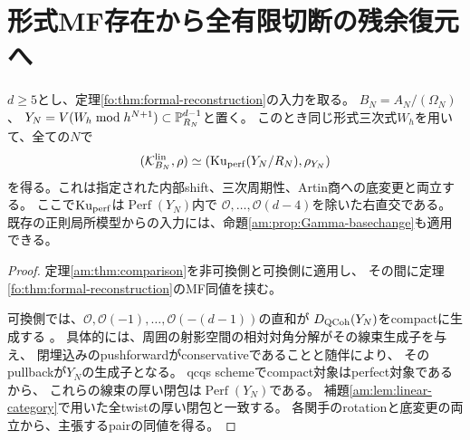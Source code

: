 \section{形式MF存在から全有限切断の残余復元へ}
\begin{corollary}[全有限Artin切断における可換残余復元]
\label{am:cor:formal-residual}
$d\ge5$とし、定理\ref{fo:thm:formal-reconstruction}の入力を取る。
$B_N=A_N/(\Omega_N)$、
$Y_N=V(W_h\bmod h^{N+1})\subset\mathbb P^{d-1}_{R_N}$と置く。
このとき同じ形式三次式$W_h$を用いて、全ての$N$で
\[
 (\mathcal K_{B_N}^{\rm lin},\rho)
 \simeq
 (\operatorname{Ku}_{\rm perf}(Y_N/R_N),\rho_{Y_N})
\]
を得る。これは指定された内部shift、三次周期性、Artin商への底変更と両立する。
ここで$\operatorname{Ku}_{\rm perf}$は$\operatorname{Perf}(Y_N)$内で
$\mathcal O,\ldots,\mathcal O(d-4)$を除いた右直交である。
既存の正則局所模型からの入力には、命題\ref{am:prop:Gamma-basechange}も適用できる。
\end{corollary}
\begin{proof}
定理\ref{am:thm:comparison}を非可換側と可換側に適用し、
その間に定理\ref{fo:thm:formal-reconstruction}のMF同値を挟む。

可換側では、$\mathcal O,\mathcal O(-1),\ldots,\mathcal O(-(d-1))$の直和が
$D_{\rm QCoh}(Y_N)$をcompactに生成する
\cite[Tag 0BQT, Remark 36.16.4]{AMStacks}。
具体的には、周囲の射影空間の相対対角分解がその線束生成子を与え、
閉埋込みのpushforwardがconservativeであることと随伴により、
そのpullbackが$Y_N$の生成子となる。
qcqs schemeでcompact対象はperfect対象である
\cite[Tag 09M1, Proposition 36.17.1]{AMStacks}から、
これらの線束の厚い閉包は$\operatorname{Perf}(Y_N)$である。
補題\ref{am:lem:linear-category}で用いた全twistの厚い閉包と一致する。
各関手のrotationと底変更の両立から、主張するpairの同値を得る。
\end{proof}
